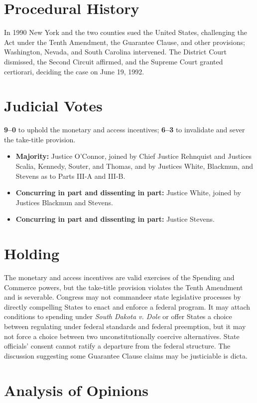 \documentclass[12pt]{article}
\begin{document}
\section{Procedural History}

In 1990 New York and the two counties sued the United States, challenging the Act under the Tenth Amendment, the Guarantee Clause, and other provisions; Washington, Nevada, and South Carolina intervened. The District Court dismissed, the Second Circuit affirmed, and the Supreme Court granted certiorari, deciding the case on June 19, 1992.

\section{Judicial Votes}

\textbf{9--0} to uphold the monetary and access incentives; \textbf{6--3} to invalidate and sever the take-title provision.
\begin{itemize}
\item \textbf{Majority:} Justice O'Connor, joined by Chief Justice Rehnquist and Justices Scalia, Kennedy, Souter, and Thomas, and by Justices White, Blackmun, and Stevens as to Parts III-A and III-B.
\item \textbf{Concurring in part and dissenting in part:} Justice White, joined by Justices Blackmun and Stevens.
\item \textbf{Concurring in part and dissenting in part:} Justice Stevens.
\end{itemize}

\section{Holding}

The monetary and access incentives are valid exercises of the Spending and Commerce powers, but the take-title provision violates the Tenth Amendment and is severable. Congress may not commandeer state legislative processes by directly compelling States to enact and enforce a federal program. It may attach conditions to spending under \textit{South Dakota v. Dole} or offer States a choice between regulating under federal standards and federal preemption, but it may not force a choice between two unconstitutionally coercive alternatives. State officials' consent cannot ratify a departure from the federal structure. The discussion suggesting some Guarantee Clause claims may be justiciable is dicta.

\section{Analysis of Opinions}
\end{document}
